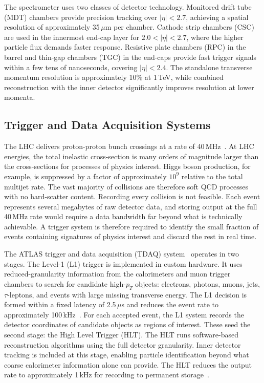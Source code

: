 The spectrometer uses two classes of detector technology. 
Monitored drift tube (MDT) chambers provide precision tracking over $|\eta| < 2.7$, achieving a spatial resolution of approximately 35\,$\mu$m per chamber. 
Cathode strip chambers (CSC) are used in the innermost end-cap layer for $2.0 < |\eta| < 2.7$, where the higher particle flux demands faster response. 
Resistive plate chambers (RPC) in the barrel and thin-gap chambers (TGC) in the end-caps provide fast trigger signals within a few tens of nanoseconds, covering $|\eta| < 2.4$. 
The standalone transverse momentum resolution is approximately 10\% at 1\,TeV, while combined reconstruction with the inner detector significantly improves resolution at lower momenta.

\subsection{Trigger and Data Acquisition Systems}

The LHC delivers proton-proton bunch crossings at a rate of 40\,MHz~\cite{atlas}. 
At LHC energies, the total inelastic cross-section is many orders of magnitude larger than the cross-sections for processes of physics interest. 
Higgs boson production, for example, is suppressed by a factor of approximately $10^9$ relative to the total multijet rate. 
The vast majority of collisions are therefore soft QCD processes with no hard-scatter content. 
Recording every collision is not feasible. 
Each event represents several megabytes of raw detector data, and storing output at the full 40\,MHz rate would require a data bandwidth far beyond what is technically achievable. 
A trigger system is therefore required to identify the small fraction of events containing signatures of physics interest and discard the rest in real time.

The ATLAS trigger and data acquisition (TDAQ) system~\cite{atlas} operates in two stages. 
The Level-1 (L1) trigger is implemented in custom hardware. 
It uses reduced-granularity information from the calorimeters and muon trigger chambers to search for candidate high-$p_T$ objects: electrons, photons, muons, jets, $\tau$-leptons, and events with large missing transverse energy. 
The L1 decision is formed within a fixed latency of 2.5\,$\mu$s and reduces the event rate to approximately 100\,kHz~\cite{ATLASTriggerRun2}. 
For each accepted event, the L1 system records the detector coordinates of candidate objects as regions of interest. 
These seed the second stage: the High Level Trigger (HLT). 
The HLT runs software-based reconstruction algorithms using the full detector granularity. 
Inner detector tracking is included at this stage, enabling particle identification beyond what coarse calorimeter information alone can provide. 
The HLT reduces the output rate to approximately 1\,kHz for recording to permanent storage~\cite{ATLASTriggerRun2}.

